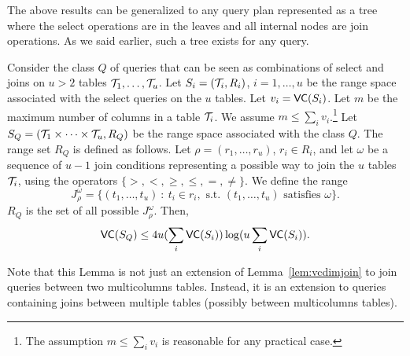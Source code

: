
The above results can be generalized to any query plan represented as a tree
where the select operations are in the leaves and all internal nodes are join
operations. As we said earlier, such a tree exists for any query.

\begin{lemma}\label{lem:vcdimmuljoin}
  Consider the class $Q$ of queries that can be seen as combinations of select
  and joins on $u>2$ tables ${\cal T}_1,\dots,{\cal T}_u$. Let $S_i=({\cal T}_i,R_i)$,
  $i=1,\dots,u$ be the range space associated with the select queries on the $u$
  tables. Let $v_i=\mathsf{VC}(S_i)$. Let $m$ be the maximum number of columns in a table
  ${\cal T}_i$. We assume $m\le \sum_i v_i$.\footnote{The assumption $m\le \sum_i
  v_i$ is reasonable for any practical case.} Let $S_Q = ({\cal T}_1\times\dots\times
  {\cal T}_u, R_Q)$ be the range space associated with the class $Q$. The range set
  $R_Q$ is defined as follows. Let $\rho = (r_1,\dots,r_u)$, $r_i\in R_i$, and
  let $\omega$ be a sequence of
  $u-1$ join conditions representing a possible way to join the $u$ tables ${\cal T}_i$,
  using the operators $\{>,<,\ge,\le,=,\neq\}$. We define the range 
  \[
  J^\omega_{\rho} = \{(t_1,\dots,t_u) ~:~ t_i\in r_i, \mbox{ s.t. }
  (t_1,\dots,t_u) \mbox{ satisfies } \omega\}.\]
  $R_Q$ is the set of all possible $J^\omega_{\rho}$. Then,
  \[
  \mathsf{VC}(S_Q)\leq 4u(\sum_i \mathsf{VC}(S_i))\log(u\sum_i \mathsf{VC}(S_i)).
  \]
\end{lemma}

Note that this Lemma is not just an extension of Lemma~\ref{lem:vcdimjoin}
to join queries between two multicolumns tables. Instead, it is an extension to
queries containing joins between multiple tables (possibly between multicolumns
tables).

